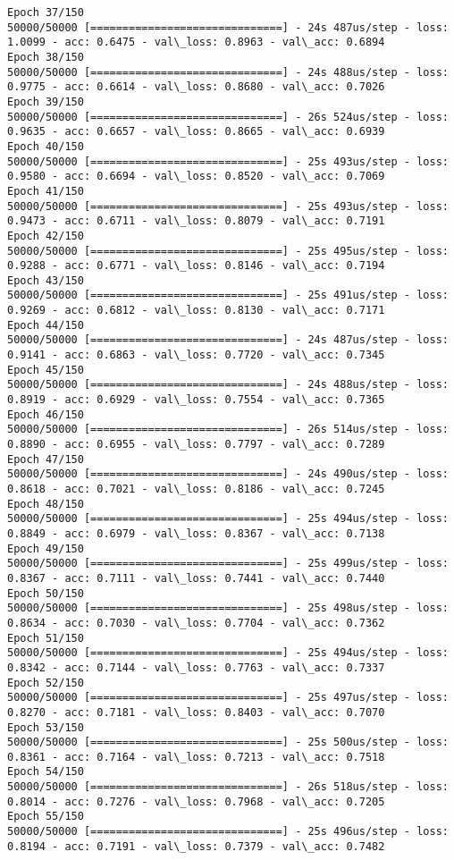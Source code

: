 \documentclass[11pt]{article}
\begin{document}
\begin{Verbatim}[commandchars=\\\{\}]
Epoch 37/150
50000/50000 [==============================] - 24s 487us/step - loss: 1.0099 - acc: 0.6475 - val\_loss: 0.8963 - val\_acc: 0.6894
Epoch 38/150
50000/50000 [==============================] - 24s 488us/step - loss: 0.9775 - acc: 0.6614 - val\_loss: 0.8680 - val\_acc: 0.7026
Epoch 39/150
50000/50000 [==============================] - 26s 524us/step - loss: 0.9635 - acc: 0.6657 - val\_loss: 0.8665 - val\_acc: 0.6939
Epoch 40/150
50000/50000 [==============================] - 25s 493us/step - loss: 0.9580 - acc: 0.6694 - val\_loss: 0.8520 - val\_acc: 0.7069
Epoch 41/150
50000/50000 [==============================] - 25s 493us/step - loss: 0.9473 - acc: 0.6711 - val\_loss: 0.8079 - val\_acc: 0.7191
Epoch 42/150
50000/50000 [==============================] - 25s 495us/step - loss: 0.9288 - acc: 0.6771 - val\_loss: 0.8146 - val\_acc: 0.7194
Epoch 43/150
50000/50000 [==============================] - 25s 491us/step - loss: 0.9269 - acc: 0.6812 - val\_loss: 0.8130 - val\_acc: 0.7171
Epoch 44/150
50000/50000 [==============================] - 24s 487us/step - loss: 0.9141 - acc: 0.6863 - val\_loss: 0.7720 - val\_acc: 0.7345
Epoch 45/150
50000/50000 [==============================] - 24s 488us/step - loss: 0.8919 - acc: 0.6929 - val\_loss: 0.7554 - val\_acc: 0.7365
Epoch 46/150
50000/50000 [==============================] - 26s 514us/step - loss: 0.8890 - acc: 0.6955 - val\_loss: 0.7797 - val\_acc: 0.7289
Epoch 47/150
50000/50000 [==============================] - 24s 490us/step - loss: 0.8618 - acc: 0.7021 - val\_loss: 0.8186 - val\_acc: 0.7245
Epoch 48/150
50000/50000 [==============================] - 25s 494us/step - loss: 0.8849 - acc: 0.6979 - val\_loss: 0.8367 - val\_acc: 0.7138
Epoch 49/150
50000/50000 [==============================] - 25s 499us/step - loss: 0.8367 - acc: 0.7111 - val\_loss: 0.7441 - val\_acc: 0.7440
Epoch 50/150
50000/50000 [==============================] - 25s 498us/step - loss: 0.8634 - acc: 0.7030 - val\_loss: 0.7704 - val\_acc: 0.7362
Epoch 51/150
50000/50000 [==============================] - 25s 494us/step - loss: 0.8342 - acc: 0.7144 - val\_loss: 0.7763 - val\_acc: 0.7337
Epoch 52/150
50000/50000 [==============================] - 25s 497us/step - loss: 0.8270 - acc: 0.7181 - val\_loss: 0.8403 - val\_acc: 0.7070
Epoch 53/150
50000/50000 [==============================] - 25s 500us/step - loss: 0.8361 - acc: 0.7164 - val\_loss: 0.7213 - val\_acc: 0.7518
Epoch 54/150
50000/50000 [==============================] - 26s 518us/step - loss: 0.8014 - acc: 0.7276 - val\_loss: 0.7968 - val\_acc: 0.7205
Epoch 55/150
50000/50000 [==============================] - 25s 496us/step - loss: 0.8194 - acc: 0.7191 - val\_loss: 0.7379 - val\_acc: 0.7482

\end{Verbatim}
\end{document}
